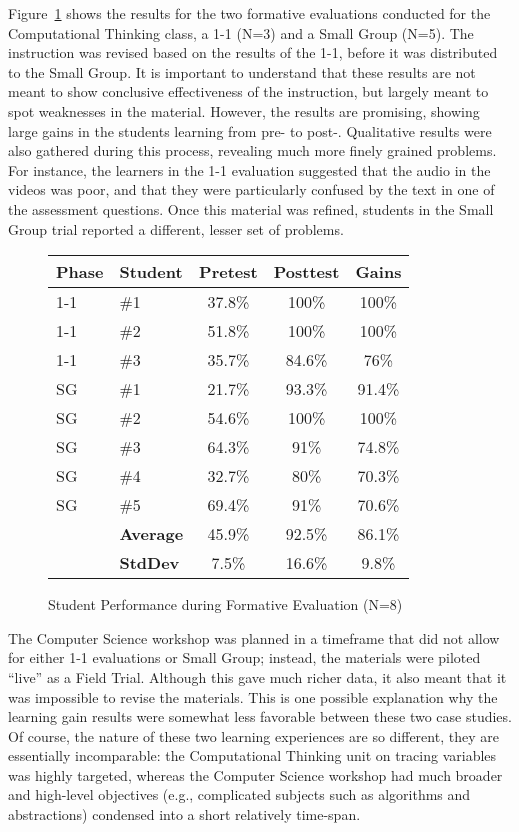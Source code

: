 Figure~\ref{fe-results} shows the results for the two formative evaluations conducted for the Computational Thinking class, a 1-1 (N=3) and a Small Group (N=5).
The instruction was revised based on the results of the 1-1, before it was distributed to the Small Group.
It is important to understand that these results are not meant to show conclusive effectiveness of the instruction, but largely meant to spot weaknesses in the material.
However, the results are promising, showing large gains in the students learning from pre- to post-.
Qualitative results were also gathered during this process, revealing much more finely grained problems.
For instance, the learners in the 1-1 evaluation suggested that the audio in the videos was poor, and that they were particularly confused by the text in one of the assessment questions.
Once this material was refined, students in the Small Group trial reported a different, lesser set of problems.

\begin{figure}[ht]
\begin{center}
\begin{tabular}{l|l|c|c|c}
	Phase & Student & Pretest & Posttest & Gains\\\hline
	1-1 & \#1 & 37.8\% & 100\% & 100\%\\
	1-1 & \#2 & 51.8\% & 100\% & 100\%\\
	1-1 & \#3 & 35.7\% & 84.6\% & 76\%\\\hline
	SG & \#1 & 21.7\% & 93.3\% & 91.4\%\\
	SG & \#2 & 54.6\% & 100\% & 100\%\\
	SG & \#3 & 64.3\% & 91\% & 74.8\%\\
	SG & \#4 & 32.7\% & 80\% & 70.3\%\\
	SG & \#5 & 69.4\% & 91\% & 70.6\%\\\hline
	& \textbf{Average} & 45.9\% & 92.5\% & 86.1\%\\
	& \textbf{StdDev} & 7.5\% & 16.6\% & 9.8\%\\
\end{tabular}
\end{center}
\caption{Student Performance during Formative Evaluation (N=8)}
\label{fe-results}
\end{figure}

The Computer Science workshop was planned in a timeframe that did not allow for either 1-1 evaluations or Small Group; instead, the materials were piloted ``live'' as a Field Trial.
Although this gave much richer data, it also meant that it was impossible to revise the materials.
This is one possible explanation why the learning gain results were somewhat less favorable between these two case studies.
Of course, the nature of these two learning experiences are so different, they are essentially incomparable: the Computational Thinking unit on tracing variables was highly targeted, whereas the Computer Science workshop had much broader and high-level objectives (e.g., complicated subjects such as algorithms and abstractions) condensed into a short relatively time-span.


